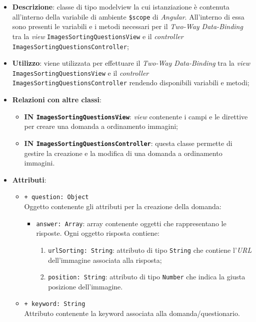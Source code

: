 \begin{itemize}
	\item \textbf{Descrizione}: classe di tipo modelview la cui istanziazione è contenuta all'interno della variabile di ambiente \texttt{\$scope} di \textit{Angular}. All'interno di essa sono presenti le variabili e i metodi necessari per il \textit{Two-Way Data-Binding} tra la \textit{view} \texttt{ImagesSortingQuestionsView} e il \textit{controller} \texttt{ImagesSortingQuestionsController}; 
	\item \textbf{Utilizzo}: viene utilizzata per effettuare il \textit{Two-Way Data-Binding} tra la \textit{view}\\ \texttt{ImagesSortingQuestionsView} e il \textit{controller} \texttt{ImagesSortingQuestionsController} rendendo disponibili variabili e metodi;
	\item \textbf{Relazioni con altre classi}:
	\begin{itemize}
		\item \textbf{IN \texttt{ImagesSortingQuestionsView}}: \textit{view} contenente i campi e le direttive per creare una domanda a ordinamento immagini; 
		\item \textbf{IN \texttt{ImagesSortingQuestionsController}}: questa classe permette di gestire la creazione e la modifica di una domanda a ordinamento immagini.
	\end{itemize}
	\item \textbf{Attributi}:
	\begin{itemize}
		\item \texttt{+ question: Object} \\ Oggetto contenente gli attributi per la creazione della domanda:
		\begin{itemize}
			\item \texttt{answer: Array}: array contenente oggetti che rappresentano le risposte. Ogni oggetto risposta contiene:
			\begin{enumerate}
				\item \texttt{urlSorting: String}: attributo di tipo \texttt{String} che contiene l'\textit{URL} dell'immagine associata alla risposta;
				\item \texttt{position: String}: attributo di tipo \texttt{Number} che indica la giusta posizione dell'immagine.
			\end{enumerate}
		\end{itemize}
		\item \texttt{+ keyword: String} \\ Attributo contenente la keyword associata alla domanda/questionario.

\end{itemize}
\end{itemize}
